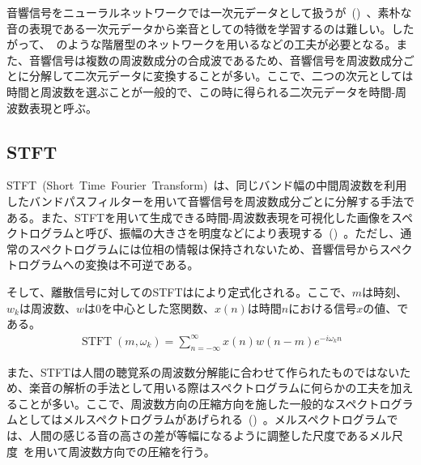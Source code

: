 音響信号をニューラルネットワークでは一次元データとして扱うが~()~、素朴な音の表現である一次元データから楽音としての特徴を学習するのは難しい。したがって、~\cite{Jukebox}のような階層型のネットワークを用いるなどの工夫が必要となる。また、音響信号は複数の周波数成分の合成波であるため、音響信号を周波数成分ごとに分解して二次元データに変換することが多い。ここで、二つの次元としては時間と周波数を選ぶことが一般的で、この時に得られる二次元データを時間-周波数表現と呼ぶ。

\subsection{STFT}

STFT~(Short~Time~Fourier~Transform)~は、同じバンド幅の中間周波数を利用したバンドパスフィルターを用いて音響信号を周波数成分ごとに分解する手法である。また、STFTを用いて生成できる時間-周波数表現を可視化した画像をスペクトログラムと呼び、振幅の大きさを明度などにより表現する~()~。ただし、通常のスペクトログラムには位相の情報は保持されないため、音響信号からスペクトログラムへの変換は不可逆である。

そして、離散信号に対してのSTFTはにより定式化される。ここで、$m$は時刻、$w_k$は周波数、$w$は0を中心とした窓関数、$x(n)$は時間$n$における信号$x$の値、である。
\begin{align}
    \label{eq:STFT}
    \operatorname{STFT}\left(m, \omega_k\right)=\sum_{n=-\infty}^{\infty} x(n) w(n-m) e^{-i \omega_k n}
\end{align}

また、STFTは人間の聴覚系の周波数分解能に合わせて作られたものではないため、楽音の解析の手法として用いる際はスペクトログラムに何らかの工夫を加えることが多い。ここで、周波数方向の圧縮方向を施した一般的なスペクトログラムとしてはメルスペクトログラムがあげられる~()~。メルスペクトログラムでは、人間の感じる音の高さの差が等幅になるように調整した尺度であるメル尺度~\cite{melscale}を用いて周波数方向での圧縮を行う。


